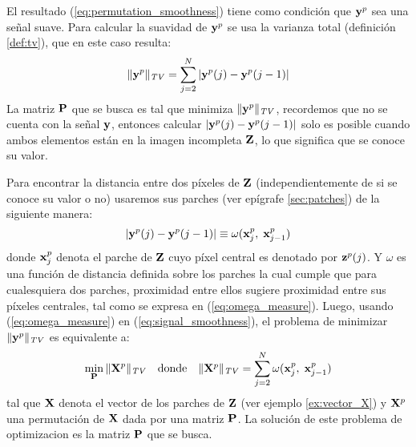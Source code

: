 El resultado (\ref{eq:permutation_smoothness}) tiene como condici\'on que $\y^p$ sea una señal suave. Para calcular la suavidad de $\y^p$ se usa la varianza total (definici\'on \ref{def:tv}), que en este caso resulta:
\begin{equation}
	\|\y^p\|_{\mathit{TV}} = \sum_{j = 2}^{N}|\y^{p}(j) - \y^{p}(j - 1)|
	\label{eq:signal_smoothness}
\end{equation}
La matriz $\P$ que se busca es tal que minimiza $\|\y^p\|_{\mathit{TV}}$, recordemos que no se cuenta con la señal  $\y$, entonces calcular $|\y^{p}(j) - \y^{p}(j - 1)|$ solo es posible cuando ambos elementos est\'an en la imagen incompleta $\Z$, lo que significa que se conoce su valor.

Para encontrar la distancia entre dos p\'ixeles de $\Z$ (independientemente de si se conoce su valor o no) usaremos sus parches (ver epígrafe \ref{sec:patches}) de la siguiente manera:
\begin{equation}
	|\y^{p}(j) - \y^{p}(j - 1)| \equiv \omega(\x_j^p,\; \x_{j - 1}^p)
	\label{eq:omega_measure}
\end{equation}
donde $\x_j^p$ denota el parche de $\Z$ cuyo p\'ixel central es denotado por $\z^p(j)$. Y $\omega$ es una funci\'on de distancia definida sobre los parches la cual cumple que para cualesquiera dos parches, proximidad entre ellos sugiere proximidad entre sus p\'ixeles centrales, tal como se expresa en (\ref{eq:omega_measure}). Luego, usando (\ref{eq:omega_measure}) en (\ref{eq:signal_smoothness}), el problema de minimizar $\|\y^p\|_{\mathit{TV}}$ es equivalente a:
\begin{equation}
	\begin{array}{ccc}
		\displaystyle\min_\P \|\X^p\|_{\mathit{TV}} & \mbox{donde} & \|\X^p\|_{\mathit{TV}}  = \displaystyle\sum_{j = 2}^{N}\omega(\x_j^{p},\; \x_{j - 1}^{p})
	\end{array}
	\label{eq:path_smoothness}
\end{equation}
tal que $\X$ denota el vector de los parches de $\Z$ (ver ejemplo \ref{ex:vector_X}) y $\X^p$ una permutaci\'on de $\X$ dada por una matriz $\P$. La soluci\'on de este problema de optimizacion es la matriz $\P$ que se busca.
